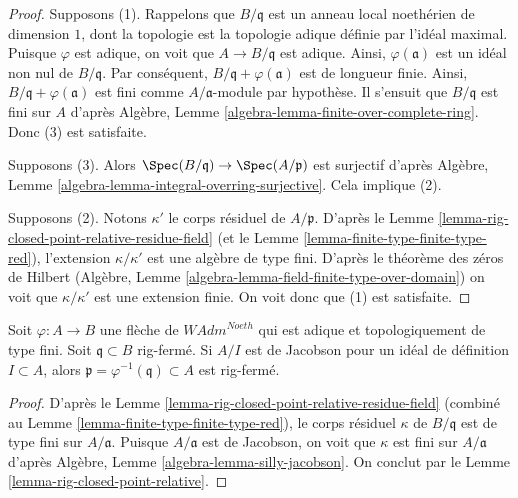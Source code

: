 \begin{proof}
Supposons (1). Rappelons que $B/\mathfrak q$ est un anneau local
noethérien de dimension $1$, dont la topologie est la topologie adique
définie par l'idéal maximal. Puisque $\varphi$ est adique, on voit que
$A \to B/\mathfrak q$ est adique. Ainsi, $\varphi(\mathfrak a)$
est un idéal non nul de $B/\mathfrak q$. Par conséquent,
$B/\mathfrak q + \varphi(\mathfrak a)$
est de longueur finie. Ainsi, $B/\mathfrak q + \varphi(\mathfrak a)$
est fini comme $A/\mathfrak a$-module par hypothèse.
Il s'ensuit que $B/\mathfrak q$ est fini sur $A$ d'après
Algèbre, Lemme \ref{algebra-lemma-finite-over-complete-ring}.
Donc (3) est satisfaite.

\medskip\noindent
Supposons (3). Alors $\Spec(B/\mathfrak q) \to \Spec(A/\mathfrak p)$
est surjectif d'après
Algèbre, Lemme \ref{algebra-lemma-integral-overring-surjective}.
Cela implique (2).

\medskip\noindent
Supposons (2). Notons $\kappa'$ le corps résiduel de $A/\mathfrak p$.
D'après le Lemme \ref{lemma-rig-closed-point-relative-residue-field}
(et le Lemme \ref{lemma-finite-type-finite-type-red}),
l'extension $\kappa/\kappa'$ est une algèbre de type fini.
D'après le théorème des zéros de Hilbert (Algèbre, Lemme
\ref{algebra-lemma-field-finite-type-over-domain})
on voit que $\kappa/\kappa'$ est une extension finie.
On voit donc que (1) est satisfaite.
\end{proof}

\begin{lemma}
\label{lemma-rig-closed-jacobson}
Soit $\varphi : A \to B$ une flèche de $\textit{WAdm}^{Noeth}$
qui est adique et topologiquement de type fini.
Soit $\mathfrak q \subset B$ rig-fermé.
Si $A/I$ est de Jacobson pour un idéal de définition $I \subset A$, alors
$\mathfrak p = \varphi^{-1}(\mathfrak q) \subset A$
est rig-fermé.
\end{lemma}

\begin{proof}
D'après le Lemme \ref{lemma-rig-closed-point-relative-residue-field}
(combiné au Lemme \ref{lemma-finite-type-finite-type-red}),
le corps résiduel $\kappa$ de $B/\mathfrak q$ est de type fini sur
$A/\mathfrak a$. Puisque $A/\mathfrak a$ est de Jacobson, on
voit que $\kappa$ est fini sur $A/\mathfrak a$ d'après
Algèbre, Lemme \ref{algebra-lemma-silly-jacobson}.
On conclut par le Lemme \ref{lemma-rig-closed-point-relative}.
\end{proof}

